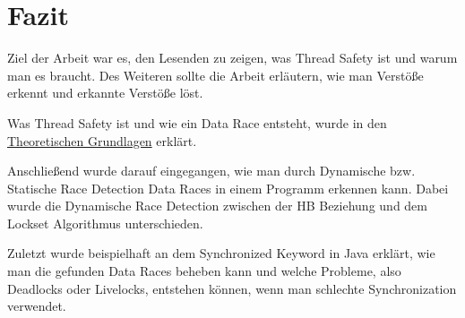 \section{Fazit}

Ziel der Arbeit war es, den Lesenden zu zeigen, was Thread Safety ist und warum man es braucht. Des Weiteren sollte die Arbeit erläutern, wie man Verstöße erkennt und erkannte Verstöße löst.

Was Thread Safety ist und wie ein Data Race entsteht, wurde in den \hyperref[sec:threadSafety]{Theoretischen Grundlagen} erklärt.


Anschließend wurde darauf eingegangen, wie man durch Dynamische bzw. Statische Race Detection Data Races in einem Programm erkennen kann. Dabei wurde die Dynamische Race Detection zwischen der \acs{HB} Beziehung und dem Lockset Algorithmus unterschieden.

Zuletzt wurde beispielhaft an dem Synchronized Keyword in Java erklärt, wie man die gefunden Data Races beheben kann und welche Probleme, also Deadlocks oder Livelocks, entstehen können, wenn man schlechte Synchronization verwendet. 